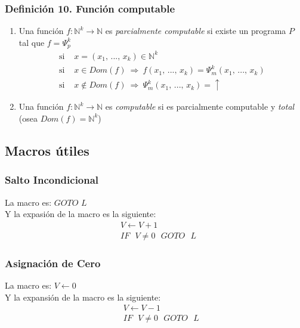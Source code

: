 \documentclass{article}
\newcommand{\comma}{,\,}                                %
\newcommand{\naturales}{\mathbb{N}}                     %
\newcommand{\Rightarrows}{\: \Rightarrow \:}            %
\newcommand{\msaltoinc}[2]{IF \text{ } #1 \neq 0 \text{ } GOTO \text{ } #2}
\newcommand{\ms}{\text{ }}
\begin{document}
\subsubsection*{Definición 10. Función computable}
\begin{enumerate}
    \item Una función $f: \naturales^k \rightarrow \naturales$ es \emph{parcialmente computable} si existe un programa $P$ tal que $f = \Psi^k_p$
    \begin{align*}
        \text{si } &x=(x_1 \comma ... \comma x_k) \in \naturales^k \\
        \text{si } &x \in Dom(f) \Rightarrows f(x_1 \comma ... \comma x_k) = \Psi^k_m(x_1 \comma ... \comma x_k) \\
        \text{si } &x \notin Dom(f) \Rightarrows \Psi^k_m(x_1 \comma ... \comma x_k) = \uparrow
    \end{align*}
    \item Una función $f: \naturales^k \rightarrow \naturales$ es \emph{computable} si es parcialmente computable y \emph{total} (osea $Dom(f) = \naturales^k$)
\end{enumerate}

\subsection{Macros útiles}
\subsubsection{Salto Incondicional}
La macro es: $GOTO$ $L$
\\Y la expasión de la macro es la siguiente:
    \begin{align*}
        &V \leftarrow V + 1 \\
        &\msaltoinc{V}{L}
    \end{align*}
    
\subsubsection{Asignación de Cero}
La macro es: $V \leftarrow 0$
\\Y la expansión de la macro es la siguiente:
    \begin{align*}
        [L] \ms &V \leftarrow V-1\\
                &\msaltoinc{V}{L}
    \end{align*}
    
\end{document}
